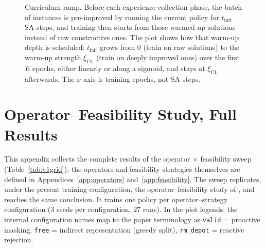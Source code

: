 \documentclass[letterpaper]{article} %
\begin{document}
\begin{figure}[t]
\centering
{}
\caption{Curriculum ramp. Before each experience-collection phase, the batch of instances is pre-improved by running the current policy for $t_{\mathrm{init}}$ SA steps, and training then starts from those warmed-up solutions instead of raw constructive ones. The plot shows how that warm-up depth is scheduled: $t_{\mathrm{init}}$ grows from $0$ (train on raw solutions) to the warm-up strength $\xi_{\mathrm{CL}}$ (train on deeply improved ones) over the first $E$ epochs, either linearly or along a sigmoid, and stays at $\xi_{\mathrm{CL}}$ afterwards. The $x$-axis is training epochs, not SA steps.}
\label{fig:ramp}
\end{figure}

\section{Operator--Feasibility Study, Full Results}
\label{app:v1}

This appendix collects the complete results of the operator $\times$ feasibility sweep (Table~\ref{tab:v1grid}); the operators and feasibility strategies themselves are defined in Appendices~\ref{app:operators} and~\ref{app:feasibility}. The sweep replicates, under the present training configuration, the operator--feasibility study of \citet{AndrettiEtAl26}, and reaches the same conclusion. It trains one policy per operator--strategy configuration ($3$ seeds per configuration, $27$ runs). In the plot legends, the internal configuration names map to the paper terminology as \texttt{valid} = proactive masking, \texttt{free} = indirect representation (greedy split), \texttt{rm\_depot} = reactive rejection.
\end{document}
